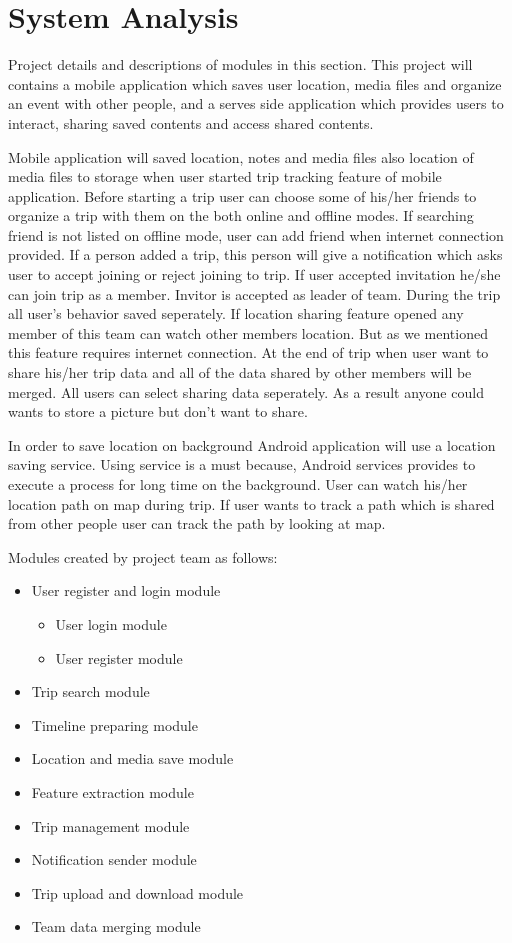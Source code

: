 \chapter{System Analysis}
Project details and descriptions of modules in this section.
This project will contains a mobile application which saves user location, media files and organize an event with other people, and a serves side application which provides users to interact, sharing saved contents and access shared contents. 

Mobile application will saved location, notes and media files also location of media files to storage when user started trip tracking feature of mobile application. Before starting a trip user can choose some of his/her friends to organize a trip with them on the both online and offline modes. If searching friend is not listed on offline mode, user can add friend when internet connection provided. If a person added a trip, this person will give a notification which asks user to accept joining or reject joining to trip. If user accepted invitation he/she can join trip as a member. Invitor is accepted as leader of team. During the trip all user's behavior saved seperately. If location sharing feature opened any member of this team can watch other members location. But as we mentioned this feature requires internet connection. At the end of trip when user want to share his/her trip data and all of the data shared by other members will be merged. All users can select sharing data seperately. As a result anyone could wants to store a picture but don't want to share. 

In order to save location on background Android application will use a location saving service. Using service is a must because, Android services provides to execute a process for long time on the background. User can watch his/her location path on map during trip. If user wants to track a path which is shared from other people user can track the path by looking at map.

Modules created by project team as follows:
\begin{itemize}
    \item User register and login module
    \begin{itemize}
        \item User login module
        \item User register module
    \end{itemize}
    \item Trip search module
    \item Timeline preparing module
    \item Location and media save module
    \item Feature extraction module
    \item Trip management module
    \item Notification sender module
    \item Trip upload and download module
    \item Team data merging module
\end{itemize}

